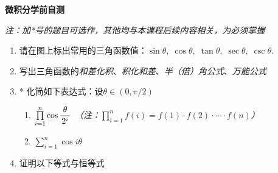 \begin{center}
	{\Large\bf 微积分学前自测}
	
	{\it 注：加*号的题目可选作，其他均与本课程后续内容相关，为必须掌握}
\end{center}

\begin{enumerate}
  \item 请在图上标出常用的三角函数值：$\sin\theta,\;\cos\theta,\;\tan\theta,\;
  \sec\theta,\;\csc\theta.$
  \begin{figure}[!htb]
  	\centering
  \end{figure}
  \item 写出三角函数的{\it 和差化积}、{\it 积化和差}、{\it 半（倍）角公式}、{\it 万能公式}
  \item* 化简如下表达式：设$\theta\in\left(0,\pi/2\right)$
  \begin{enumerate}[(1)]
    \item $\prod\limits_{i=1}^n\cos\displaystyle\frac{\,{\theta}\,}{\,{2^i}\,}$
    \hspace{2cm}
    {\it（注：$\prod\limits_{i=1}^nf(i)=f(1)\cdot f(2)\cdot\cdots\cdot
    f(n)$）}
    \item $\sum\limits_{i=1}^n\cos i\theta$
  \end{enumerate}
  \item 证明以下等式与恒等式

\end{enumerate}
